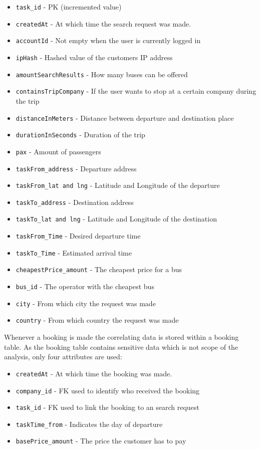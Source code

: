 \begin{itemize}
  \item \verb|task_id| - PK (incremented value) 
  \item \verb|createdAt| - At which time the search request was made.
  \item \verb|accountId| - Not empty when the user is currently logged in
   \item \verb|ipHash| - Hashed value of the customers IP address
  \item \verb|amountSearchResults| - How many buses can be offered
  \item \verb|containsTripCompany| - If the user wants to stop at a certain company during the trip
  \item \verb|distanceInMeters|  - Distance between departure and destination place
  \item \verb|durationInSeconds| - Duration of the trip
  \item \verb|pax|  - Amount of passengers
  \item \verb|taskFrom_address| - Departure address 
  \item \verb|taskFrom_lat and lng| - Latitude and Longitude of the departure
  \item \verb|taskTo_address|  - Destination address
  \item \verb|taskTo_lat and lng| - Latitude and Longitude of the destination
  \item \verb|taskFrom_Time|  - Desired departure time 
  \item \verb|taskTo_Time|  - Estimated arrival time
  \item \verb|cheapestPrice_amount| - The cheapest price for a bus
  \item \verb|bus_id| - The operator with the cheapest bus
  \item \verb|city| - From which city the request was made
  \item \verb|country| - From which country the request was made
\end{itemize}

Whenever a booking is made the correlating data is stored within a booking table. As the booking table contains sensitive data which is not scope of the analysis, only four attributes are used: 

\begin{itemize}
	\item \verb|createdAt| - At which time the booking was made.
	\item \verb|company_id| - FK used to identify who received the booking
	\item \verb|task_id| - FK used to link the booking to an search request 
	\item \verb|taskTime_from| - Indicates the day of departure
	\item \verb|basePrice_amount| - The price the customer has to pay
\end{itemize} 


